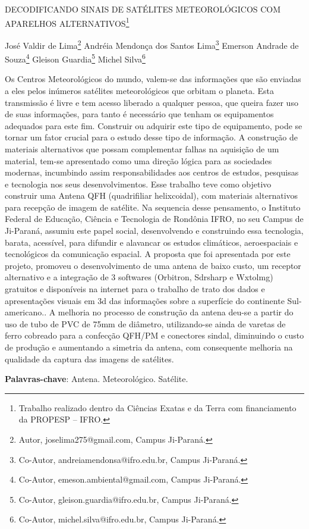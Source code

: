 \documentclass[article,12pt,onesidea,4paper,english,brazil]{abntex2}
\begin{document}
	
	
	\frenchspacing 
	
	\begin{center}
		\LARGE DECODIFICANDO SINAIS DE SATÉLITES METEOROLÓGICOS COM APARELHOS ALTERNATIVOS\footnote{Trabalho realizado dentro da Ciências Exatas e da Terra com financiamento da PROPESP – IFRO.}
		
		\normalsize
		José Valdir de Lima\footnote{Autor, joselima275@gmail.com, Campus Ji-Paraná.} 
		Andréia Mendonça dos Santos Lima\footnote{Co-Autor, andreiamendonsa@ifro.edu.br, Campus Ji-Paraná.} 
		Emerson Andrade de Souza\footnote{Co-Autor, emeson.ambiental@gmail.com, Campus Ji-Paraná.} 
		Gleison Guardia\footnote{Co-Autor, gleison.guardia@ifro.edu.br, Campus Ji-Paraná.}
		Michel Silva\footnote{Co-Autor, michel.silva@ifro.edu.br, Campus Ji-Paraná.} 
	\end{center}
	
	\noindent Os Centros Meteorológicos do mundo, valem-se das informações que são enviadas
	a eles pelos inúmeros satélites meteorológicos que orbitam o planeta. Esta
	transmissão é livre e tem acesso liberado a qualquer pessoa, que queira fazer uso
	de suas informações, para tanto é necessário que tenham os equipamentos
	adequados para este fim. Construir ou adquirir este tipo de equipamento, pode se
	tornar um fator crucial para o estudo desse tipo de informação. A construção de
	materiais alternativos que possam complementar falhas na aquisição de um
	material, tem-se apresentado como uma direção lógica para as sociedades
	modernas, incumbindo assim responsabilidades aos centros de estudos, pesquisas
	e tecnologia nos seus desenvolvimentos. Esse trabalho teve como objetivo construir
	uma Antena QFH (quadrifiliar helixcoidal), com materiais alternativos para recepção
	de imagem de satélite. Na sequencia desse pensamento, o Instituto Federal de
	Educação, Ciência e Tecnologia de Rondônia IFRO, no seu Campus de Ji-Paraná,
	assumiu este papel social, desenvolvendo e construindo essa tecnologia, barata,
	acessível, para difundir e alavancar os estudos climáticos, aeroespaciais e
	tecnológicos da comunicação espacial. A proposta que foi apresentada por este
	projeto, promoveu o desenvolvimento de uma antena de baixo custo, um receptor
	alternativo e a integração de 3 softwares (Orbitron, Sdrsharp e Wxtolmg) gratuitos e
	disponíveis na internet para o trabalho de trato dos dados e apresentações visuais
	em 3d das informações sobre a superfície do continente Sul-americano.. A melhoria
	no processo de construção da antena deu-se a partir do uso de tubo de PVC de
	75mm de diâmetro, utilizando-se ainda de varetas de ferro cobreado para a
	confecção QFH/PM e conectores sindal, diminuindo o custo de produção e
	aumentando a simetria da antena, com consequente melhoria na qualidade da
	captura das imagens de satélites.
	
	\vspace{\onelineskip}
	
	\noindent
	\textbf{Palavras-chave}: Antena. Meteorológico. Satélite.
	
\end{document}
